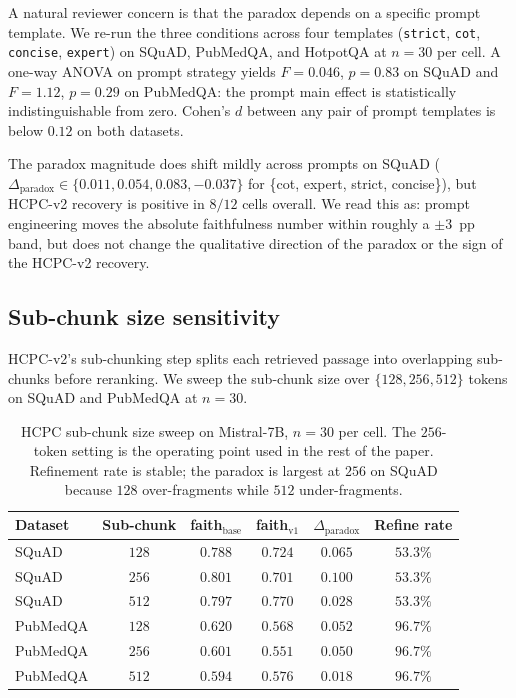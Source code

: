 A natural reviewer concern is that the paradox depends on a specific
prompt template. We re-run the three conditions across four templates
(\texttt{strict}, \texttt{cot}, \texttt{concise}, \texttt{expert}) on
SQuAD, PubMedQA, and HotpotQA at $n=30$ per cell. A one-way ANOVA on
prompt strategy yields $F=0.046$, $p=0.83$ on SQuAD and $F=1.12$,
$p=0.29$ on PubMedQA: the prompt main effect is statistically
indistinguishable from zero. Cohen's $d$ between any pair of prompt
templates is below $0.12$ on both datasets.

The paradox magnitude does shift mildly across prompts on SQuAD
($\Delta_{\textrm{paradox}} \in \{0.011, 0.054, 0.083, -0.037\}$ for
\{cot, expert, strict, concise\}), but HCPC-v2 recovery is positive in
$8/12$ cells overall. We read this as: prompt engineering moves the
absolute faithfulness number within roughly a $\pm 3$~pp band, but does
not change the qualitative direction of the paradox or the sign of the
HCPC-v2 recovery.

\subsection{Sub-chunk size sensitivity}
\label{sec:rob:subchunk}

HCPC-v2's sub-chunking step splits each retrieved passage into
overlapping sub-chunks before reranking. We sweep the sub-chunk size
over $\{128, 256, 512\}$ tokens on SQuAD and PubMedQA at $n=30$.

\begin{table}[!htb]
\centering
\caption{HCPC sub-chunk size sweep on Mistral-7B, $n=30$ per cell. The
$256$-token setting is the operating point used in the rest of the
paper. Refinement rate is stable; the paradox is largest at $256$ on
SQuAD because $128$ over-fragments while $512$ under-fragments.}
\label{tab:subchunk}
\footnotesize
\begin{tabular}{lccccc}
\toprule
Dataset & Sub-chunk & faith$_{\textrm{base}}$ & faith$_{\textrm{v1}}$ & $\Delta_{\textrm{paradox}}$ & Refine rate \\
\midrule
SQuAD     & $128$ & $0.788$ & $0.724$ & $0.065$ & $53.3\%$ \\
SQuAD     & $256$ & $0.801$ & $0.701$ & $\mathbf{0.100}$ & $53.3\%$ \\
SQuAD     & $512$ & $0.797$ & $0.770$ & $0.028$ & $53.3\%$ \\
\midrule
PubMedQA  & $128$ & $0.620$ & $0.568$ & $0.052$ & $96.7\%$ \\
PubMedQA  & $256$ & $0.601$ & $0.551$ & $0.050$ & $96.7\%$ \\
PubMedQA  & $512$ & $0.594$ & $0.576$ & $0.018$ & $96.7\%$ \\
\bottomrule
\end{tabular}
\end{table}


